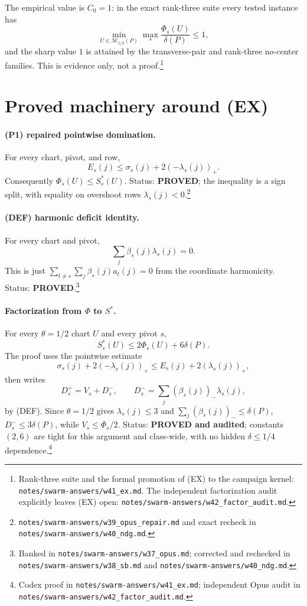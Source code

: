 \documentclass[11pt]{article}
\theoremstyle{plain}
\theoremstyle{definition}
\theoremstyle{remark}
\begin{document}
\noindent The empirical value is $C_0=1$: in the exact rank-three suite every
tested instance has
\[
\min_{U\in\mathcal M_{1/2}(P)}\max_s\frac{\Phi_s(U)}{\delta(P)}\le1,
\]
and the sharp value $1$ is attained by the transverse-pair and rank-three
no-center families.  This is evidence only, not a proof.\footnote{Rank-three
suite and the formal promotion of \textup{(EX)} to the campaign kernel:
\texttt{notes/swarm-answers/w41\_ex.md}.  The independent factorization audit
explicitly leaves \textup{(EX)} open:
\texttt{notes/swarm-answers/w42\_factor\_audit.md}.}

\section{Proved machinery around \textup{(EX)}}

\paragraph{(P1) repaired pointwise domination.}
For every chart, pivot, and row,
\[
E_s(j)\le \sigma_s(j)+2(-\lambda_s(j))_+.
\tag{P1}
\]
Consequently $\Phi_s(U)\le S^*_s(U)$.  Status:
\textbf{PROVED}; the inequality is a sign split, with equality on overshoot
rows $\lambda_s(j)<0$.\footnote{\texttt{notes/swarm-answers/w39\_opus\_repair.md}
and exact recheck in \texttt{notes/swarm-answers/w40\_ndg.md}.}

\paragraph{(DEF) harmonic deficit identity.}
For every chart and pivot,
\[
\sum_j\beta_s(j)\lambda_s(j)=0.
\tag{DEF}
\]
This is just $\sum_{t\ne s}\sum_j\beta_s(j)a_t(j)=0$ from the coordinate
harmonicity.  Status: \textbf{PROVED}.\footnote{Banked in
\texttt{notes/swarm-answers/w37\_opus.md}; corrected and rechecked in
\texttt{notes/swarm-answers/w38\_sb.md} and
\texttt{notes/swarm-answers/w40\_ndg.md}.}

\paragraph{Factorization from \texorpdfstring{$\Phi$}{Phi} to \texorpdfstring{$S^*$}{S*}.}
For every $\theta=1/2$ chart $U$ and every pivot $s$,
\[
S^*_s(U)\le 2\Phi_s(U)+6\delta(P).
\tag{F}
\]
The proof uses the pointwise estimate
\[
\sigma_s(j)+2(-\lambda_s(j))_+\le E_s(j)+2(\lambda_s(j))_+,
\]
then writes
\[
D^+_s=V_s+D^-_s,\qquad
D^-_s=\sum_j(\beta_s(j))_-\lambda_s(j),
\]
by (DEF).  Since $\theta=1/2$ gives $\lambda_s(j)\le3$ and
$\sum_j(\beta_s(j))_-\le\delta(P)$, $D^-_s\le3\delta(P)$, while
$V_s\le\Phi_s/2$.  Status: \textbf{PROVED and audited}; constants $(2,6)$ are
tight for this argument and class-wide, with no hidden $\delta\le1/4$
dependence.\footnote{Codex proof in \texttt{notes/swarm-answers/w41\_ex.md};
independent Opus audit in
\texttt{notes/swarm-answers/w42\_factor\_audit.md}.}
\end{document}
